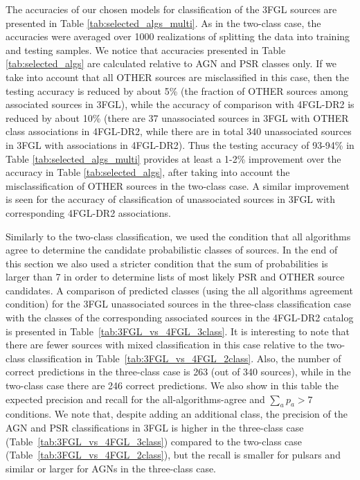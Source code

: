 \documentclass[referee]{aa} %
\begin{document}
The accuracies of our chosen models for classification of the 3FGL sources are presented in Table \ref{tab:selected_algs_multi}.
As in the two-class case, the accuracies were averaged over 1000 realizations of splitting the data into training and testing samples.
We notice that accuracies presented in Table \ref{tab:selected_algs} are calculated relative to AGN and PSR classes only. If we take into account that all OTHER sources
are misclassified in this case, then the testing accuracy is reduced by about 5\% (the fraction of OTHER sources among associated sources in 3FGL),
while the accuracy of comparison with 4FGL-DR2 is reduced by about 10\% (there are 37 unassociated sources in 3FGL with OTHER class associations in 4FGL-DR2,
while there are in total 340 unassociated sources in 3FGL with associations in 4FGL-DR2).
Thus the testing accuracy of 93-94\% in Table \ref{tab:selected_algs_multi} provides at least a 1-2\% improvement over the accuracy in Table \ref{tab:selected_algs},
after taking into account the misclassification of OTHER sources in the two-class case.
A similar improvement is seen for the accuracy of classification of unassociated sources in 3FGL with corresponding 4FGL-DR2 associations.

Similarly to the two-class classification, we used the condition that all algorithms agree to determine the candidate probabilistic classes of sources.
In the end of this section we also used a stricter condition that the sum of probabilities is larger than 7 in order to determine lists of most likely PSR and OTHER source candidates.
A comparison of predicted classes (using the all algorithms agreement condition) for the 3FGL unassociated sources in the three-class classification case with the classes of the corresponding associated sources in the 4FGL-DR2 catalog is presented in Table~\ref{tab:3FGL_vs_4FGL_3class}.
It is interesting to note that there are fewer sources with mixed classification in this case relative to the two-class classification in 
Table~\ref{tab:3FGL_vs_4FGL_2class}.
Also, the number of correct predictions in the three-class case is 263 (out of 340 sources), while in the two-class case there are 246 correct predictions.
We also show in this table the expected precision and recall for the all-algorithms-agree and $\sum_a p_a > 7$
conditions.
We note that, despite adding an additional class, the precision of the AGN and PSR classifications in 3FGL
is higher in the three-class case (Table~\ref{tab:3FGL_vs_4FGL_3class}) compared to the two-class case
(Table~\ref{tab:3FGL_vs_4FGL_2class}), but the recall is smaller for pulsars and similar or larger for AGNs in the three-class case.
\end{document}
